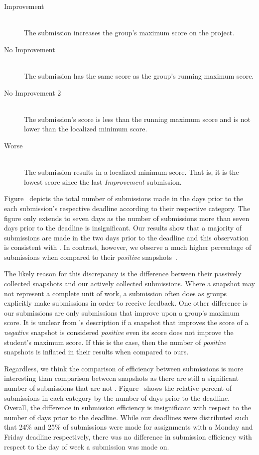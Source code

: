\begin{description}
  \item[Improvement] \hfill \\ The submission increases the group's maximum
    score on the project.
  \item[No Improvement] \hfill \\ The submission has the same score as the
    group's running maximum score.
  \item[No Improvement 2] \hfill \\ The submission's score is less than the
    running maximum score and is not lower than the localized minimum score.
  \item[Worse] \hfill \\ The submission results in a localized minimum
    score. That is, it is the lowest score since the last \emph{Improvement}
    submission.
\end{description}

Figure~ depicts the total number of submissions
made in the days prior to the each submission's respective deadline according
to their respective category. The figure only extends to seven days as the
number of submissions more than seven days prior to the deadline is
insignificant. Our results show that a majority of submissions are made in the
two days prior to the deadline and this observation is consistent with
\spacco{}. In contrast, however, we observe a much higher percentage of \imp{}
submissions when compared to their \emph{positive}
snapshots~\cite{Spacco:2013:TIP:2462476.2465594}.

The likely reason for this discrepancy is the difference between their
passively collected snapshots and our actively collected submissions. Where a
snapshot may not represent a complete unit of work, a submission often does as
groups explicitly make submissions in order to receive feedback. One other
difference is our \imp{} submissions are only submissions that improve upon a
group's maximum score. It is unclear from \spacco{}'s description if a snapshot
that improves the score of a \emph{negative} snapshot is considered
\emph{positive} even its score does not improve the student's maximum score. If
this is the case, then the number of \emph{positive} snapshots is inflated in
their results when compared to ours.

Regardless, we think the comparison of efficiency between submissions is more
interesting than comparison between snapshots as there are still a significant
number of submissions that are not
\imp{}. Figure~ shows the relative percent of
submissions in each category by the number of days prior to the
deadline. Overall, the difference in submission efficiency is insignificant
with respect to the number of days prior to the deadline. While our deadlines
were distributed such that 24\% and 25\% of submissions were made for
assignments with a Monday and Friday deadline respectively, there was no
difference in submission efficiency with respect to the day of week a
submission was made on.


